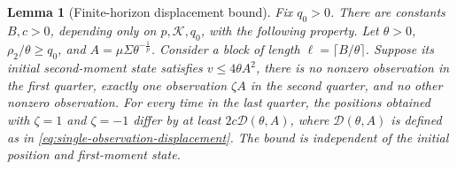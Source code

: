 \documentclass[11pt,letterpaper]{article}
\newtheorem{lemma}[theorem]{Lemma}
\theoremstyle{definition}
\begin{document}
\begin{lemma}[Finite-horizon displacement bound]
\label{lem:finite-displacement}
Fix $q_0>0$.  There are constants $B,c>0$, depending only on
$p,\mathcal K,q_0$, with the following property.  Let
$\theta>0$, $\rho_2/\theta\ge q_0$, and
$A=\mu\Sigma\theta^{-\frac{1}{p}}$. Consider a block of length
$\ell=\lceil B/\theta\rceil$.  Suppose its initial second-moment state
satisfies $v\le4\theta A^2$, there is no nonzero observation in the first
quarter, exactly one observation $\zeta A$ in the second quarter, and no other
nonzero observation.  For every time in the last quarter, the positions
obtained with $\zeta=1$ and $\zeta=-1$ differ by at least
$2c\mathcal D(\theta,A)$, where $\mathcal D(\theta,A)$ is defined as in
\eqref{eq:single-observation-displacement}.
The bound is independent of the initial position and first-moment state.
\end{lemma}
\end{document}
